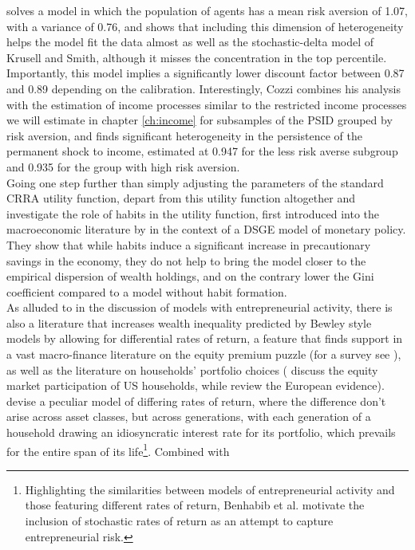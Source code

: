  solves a model in which the population of agents has a mean risk aversion of 
1.07, with a variance of 0.76, and shows that including this dimension of 
heterogeneity helps the model fit the data almost as well as the stochastic-delta
model of Krusell and Smith, although it misses the concentration in the top 
percentile. Importantly, this model implies a significantly lower discount 
factor between 0.87 and 0.89 depending on the calibration. Interestingly, Cozzi 
combines his analysis with the estimation of income processes similar to the 
restricted income processes we will estimate in chapter \ref{ch:income} for 
subsamples of the PSID grouped by risk aversion, and finds significant 
heterogeneity in the persistence of the permanent shock to income, estimated at 
0.947 for the less risk averse subgroup and 0.935 for the group with high 
risk aversion. \\
Going one step further than simply adjusting the parameters of the standard 
CRRA utility function, \citet{DPMRR2003} depart from this utility function 
altogether and investigate the role of habits in the utility function, first 
introduced into the macroeconomic literature by \citet{Fuhrer2000} in the 
context of a DSGE model of monetary policy. They show that while habits induce
a significant increase in precautionary savings in the economy, they do not 
help to bring the model closer to the empirical dispersion of wealth holdings,
and on the contrary lower the Gini coefficient compared to a model without 
habit formation. 
\vspace{0.5cm} \\
As alluded to in the discussion of models with entrepreneurial activity, there is
also a literature that increases wealth inequality predicted by Bewley style
models by allowing for differential rates of return, a feature that finds 
support in a vast macro-finance literature on the equity premium puzzle (for 
a survey see \cite{SiegelThaler1997}), as well as the literature on households'
portfolio choices (\citet{MankiwZeldes1991} discuss the equity market participation
of US households, while \citet{GuisoHaliassosJiappeli2003} review the 
European evidence).
\citet{BenhabibBisinZhu2011} devise a peculiar model of differing rates of return,
where the difference don't arise across asset classes, but across generations,
with each generation of a household drawing an idiosyncratic interest rate for 
its portfolio, which prevails for the entire span of its life\footnote{Highlighting
the similarities between models of entrepreneurial activity and those featuring 
different rates of return, Benhabib et al. motivate the inclusion of stochastic
rates of return as an attempt to capture entrepreneurial risk.}. Combined with 
